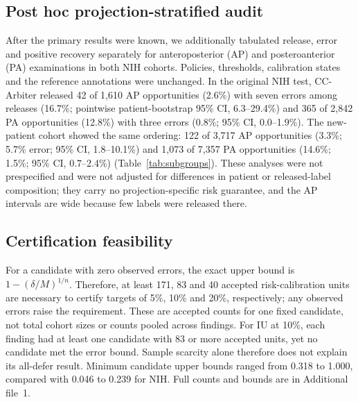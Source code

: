 \documentclass[10pt,a4paper]{article}
\begin{document}
\subsection{Post hoc projection-stratified audit}
After the primary results were known, we additionally tabulated release, error and positive recovery separately for anteroposterior (AP) and posteroanterior (PA) examinations in both NIH cohorts. Policies, thresholds, calibration states and the reference annotations were unchanged. In the original NIH test, CC-Arbiter released 42 of 1,610 AP opportunities (2.6\%) with seven errors among releases (16.7\%; pointwise patient-bootstrap 95\% CI, 6.3--29.4\%) and 365 of 2,842 PA opportunities (12.8\%) with three errors (0.8\%; 95\% CI, 0.0--1.9\%). The new-patient cohort showed the same ordering: 122 of 3,717 AP opportunities (3.3\%; 5.7\% error; 95\% CI, 1.8--10.1\%) and 1,073 of 7,357 PA opportunities (14.6\%; 1.5\%; 95\% CI, 0.7--2.4\%) (Table~\ref{tab:subgroups}). These analyses were not prespecified and were not adjusted for differences in patient or released-label composition; they carry no projection-specific risk guarantee, and the AP intervals are wide because few labels were released there.

\begin{table}[htbp]
\centering\footnotesize\setlength{\tabcolsep}{3.5pt}
\caption{Post hoc projection-stratified audit in both NIH cohorts with all policies frozen. Intervals are pointwise patient-bootstrap percentile intervals within each stratum and are not multiplicity-adjusted or calibrated as subgroup guarantees.}\label{tab:subgroups}

\end{table}

\subsection{Certification feasibility}
For a candidate with zero observed errors, the exact upper bound is $1-(\delta/M)^{1/n}$. Therefore, at least 171, 83 and 40 accepted risk-calibration units are necessary to certify targets of 5\%, 10\% and 20\%, respectively; any observed errors raise the requirement. These are accepted counts for one fixed candidate, not total cohort sizes or counts pooled across findings. For IU at 10\%, each finding had at least one candidate with 83 or more accepted units, yet no candidate met the error bound. Sample scarcity alone therefore does not explain its all-defer result. Minimum candidate upper bounds ranged from 0.318 to 1.000, compared with 0.046 to 0.239 for NIH. Full counts and bounds are in Additional file~1.
\end{document}

